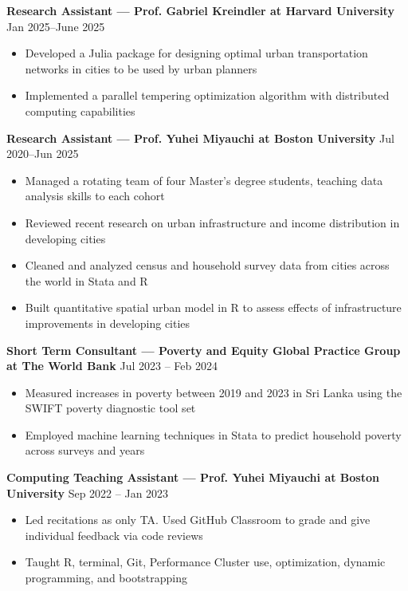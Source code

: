 \documentclass[10pt]{article}
\newenvironment{customitemize}
{ \begin{itemize}[leftmargin=\parindent, topsep = 0.2pt, itemsep = -3pt] }
{\end{itemize} }
\begin{document}
\noindent \textbf{Research Assistant --- Prof. Gabriel Kreindler at Harvard University}  \hfill Jan 2025--June 2025 
\begin{customitemize}
	\item Developed a Julia package for designing optimal urban transportation networks in cities to be used by urban planners
	\item Implemented a parallel tempering optimization algorithm with distributed computing capabilities
\end{customitemize}


\noindent \textbf{Research Assistant --- Prof. Yuhei Miyauchi at Boston University}  \hfill Jul 2020--Jun 2025 
\begin{customitemize}
	\item Managed a rotating team of four Master's degree students, teaching data analysis skills to each cohort
	\item Reviewed recent research on urban infrastructure and income distribution in developing cities
	\item Cleaned and analyzed census and household survey data from cities across the world in Stata and R
	\item Built quantitative spatial urban model in R to assess effects of infrastructure improvements in developing cities
\end{customitemize}

\noindent \textbf{Short Term Consultant --- Poverty and Equity Global Practice Group at The World Bank}  \hfill Jul 2023 -- Feb 2024
\begin{customitemize}
	\item Measured increases in poverty between 2019 and 2023 in Sri Lanka using the SWIFT poverty diagnostic tool set
	\item Employed machine learning techniques in Stata to predict household poverty across surveys and years
\end{customitemize}

\noindent \textbf{Computing Teaching Assistant --- Prof. Yuhei Miyauchi at Boston University}  \hfill Sep 2022 -- Jan 2023
\begin{customitemize}
	\item Led recitations as only TA. Used GitHub Classroom to grade and give individual feedback via code reviews
	\item Taught R, terminal, Git, Performance Cluster use, optimization, dynamic programming, and bootstrapping 
\end{customitemize}
\end{document}
